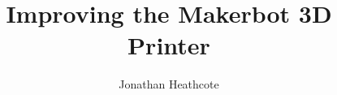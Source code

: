 \documentclass[a4paper,12pt]{third-rep}
\title{Improving the Makerbot 3D Printer}
\author{Jonathan Heathcote}
\begin{document}
	\dotitleandabstract
	
	\tableofcontents
	\listoffigures
	\listoftables
 
	
	
	
	
	
	
	
	
	
	
	
	\appendix
	
	
	
	
	
	
\end{document}
